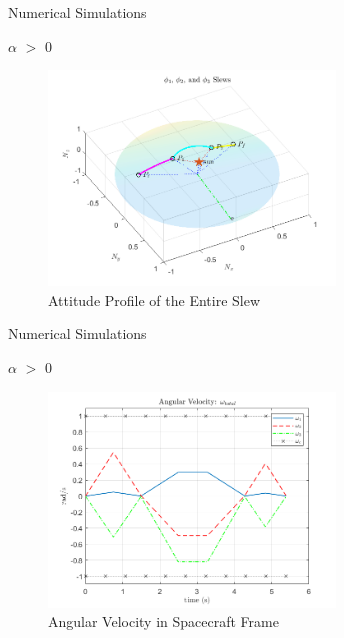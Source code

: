 \documentclass{beamer}
\begin{document}
\begin{frame}{Numerical Simulations}
	\begin{block}{$\alpha$ $>$ 0}
		\begin{figure}[H]
			\label{fig:phi1_phi2_phi3}
			\includegraphics[width=3in]{figures/alphaNot0/phi1_phi2_phi3.png}
			\caption{Attitude Profile of the Entire Slew}
		\end{figure}
	\end{block}
\end{frame}
\begin{frame}{Numerical Simulations}
	\begin{block}{$\alpha$ $>$ 0}
		
		\begin{figure}
			\centering
				\label{fig:ang_vel_phi_total}
					\includegraphics[width=3in]{figures/alphaNot0/ang_vel_phi_total.png}
				\caption{Angular Velocity in Spacecraft Frame}
		\end{figure}


	\end{block}
\end{frame}
\end{document}
